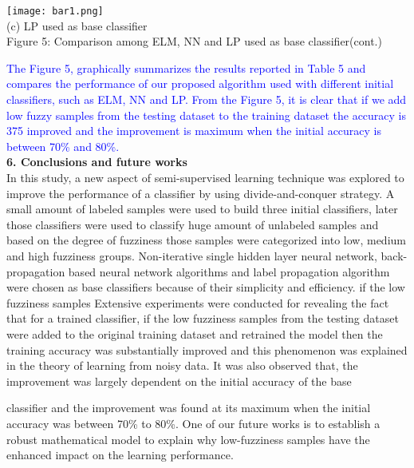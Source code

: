 \documentclass{article}
\begin{document}
		
		
		\newpage
		\begin{center}
			\texttt{[image: bar1.png]} \\
			\small (c) LP used as base classifier \\
			\vspace{1em}
			Figure 5: Comparison among ELM, NN and LP used as base classifier(cont.)
		\end{center}
		
		\textcolor{blue}{The Figure 5, graphically summarizes the results reported in Table 5 and compares the performance of
			our proposed algorithm used with different initial classifiers, such as ELM, NN and LP. From the Figure 5,
			it is clear that if we add low fuzzy samples from the testing dataset to the training dataset the accuracy is
			375 improved and the improvement is maximum when the initial accuracy is between 70\% and 80\%.}\\
		
		\textbf{6. Conclusions and future works}\\
		In this study, a new aspect of semi-supervised learning technique was explored to improve the performance of a classifier by using divide-and-conquer strategy.  A small amount of labeled samples were used to build
		three initial classifiers, later those classifiers were used to classify huge amount of unlabeled samples and based on the degree of fuzziness those samples were categorized into low,  medium and high fuzziness groups. Non-iterative single hidden layer neural network, back-propagation based neural network algorithms and label
		propagation algorithm were chosen as base classifiers because of their simplicity and efficiency. if the low fuzziness samples Extensive
		experiments were conducted for revealing the fact that for a trained classifier, if the low fuzziness samples
		from the testing dataset were added to the original training dataset and retrained the model then the training
		 accuracy was substantially improved and this phenomenon was explained in the theory of learning from noisy
		data. It was also observed that, the improvement was largely dependent on the initial accuracy of the base	
		
		
		\newpage
		classifier and the improvement was found at its maximum when the initial accuracy was between 70\% to
		80\%. One of our future works is to establish a robust mathematical model to explain why low-fuzziness
		samples have the enhanced impact on the learning performance.\\
		\vspace{0.6em}
		
\end{document}
